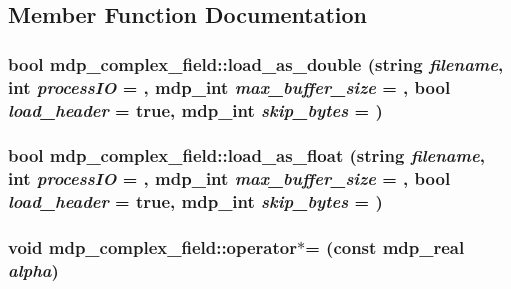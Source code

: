 \subsection{Member Function Documentation}
\hypertarget{classmdp__complex__field_ae7c4fe41d81ce71b9d1527b15916391f}{
\subsubsection[{load\_\-as\_\-double}]{\setlength{\rightskip}{0pt plus 5cm}bool mdp\_\-complex\_\-field::load\_\-as\_\-double (string {\em filename}, \/  int {\em processIO} = {}, \/  {\bf mdp\_\-int} {\em max\_\-buffer\_\-size} = {}, \/  bool {\em load\_\-header} = {\ttfamily true}, \/  {\bf mdp\_\-int} {\em skip\_\-bytes} = {})}}
\label{classmdp__complex__field_ae7c4fe41d81ce71b9d1527b15916391f}
\hypertarget{classmdp__complex__field_a41ca79e9686143c660588426dc71dd0b}{
\subsubsection[{load\_\-as\_\-float}]{\setlength{\rightskip}{0pt plus 5cm}bool mdp\_\-complex\_\-field::load\_\-as\_\-float (string {\em filename}, \/  int {\em processIO} = {}, \/  {\bf mdp\_\-int} {\em max\_\-buffer\_\-size} = {}, \/  bool {\em load\_\-header} = {\ttfamily true}, \/  {\bf mdp\_\-int} {\em skip\_\-bytes} = {})}}
\label{classmdp__complex__field_a41ca79e9686143c660588426dc71dd0b}
\hypertarget{classmdp__complex__field_af890e25006822910f411ce10ba7dfc7a}{
\subsubsection[{operator$\ast$=}]{\setlength{\rightskip}{0pt plus 5cm}void mdp\_\-complex\_\-field::operator$\ast$= (const {\bf mdp\_\-real} {\em alpha})}}

